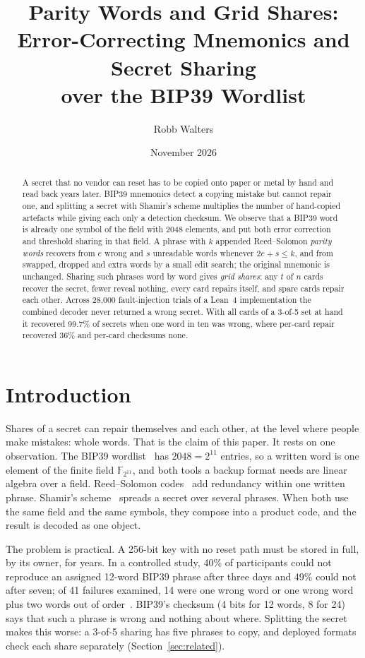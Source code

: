 \documentclass[numeric]{anvil-paper}
\title{Parity Words and Grid Shares:\\ Error-Correcting Mnemonics and Secret Sharing\\ over the BIP39 Wordlist}
\author{Robb Walters}
\date{November 2026}
\newcommand{\F}{\mathbb{F}}
\begin{document}
\maketitle

\begin{abstract}
A secret that no vendor can reset has to be copied onto paper or metal by hand
and read back years later. BIP39 mnemonics detect a copying mistake but cannot
repair one, and splitting a secret with Shamir's scheme multiplies the number of
hand-copied artefacts while giving each only a detection checksum. We observe
that a BIP39 word is already one symbol of the field with 2048 elements, and put
both error correction and threshold sharing in that field. A phrase with $k$
appended Reed--Solomon \emph{parity words} recovers from $e$ wrong and $s$
unreadable words whenever $2e+s\le k$, and from swapped, dropped and extra words
by a small edit search; the original mnemonic is unchanged. Sharing such phrases
word by word gives \emph{grid shares}: any $t$ of $n$ cards recover the secret,
fewer reveal nothing, every card repairs itself, and spare cards repair each
other. Across 28{,}000 fault-injection trials of a Lean~4 implementation the
combined decoder never returned a wrong secret. With all cards of a 3-of-5 set
at hand it recovered 99.7\% of secrets when one word in ten was wrong, where
per-card repair recovered 36\% and per-card checksums none.
\end{abstract}

\section{Introduction}
\label{sec:intro}

Shares of a secret can repair themselves and each other, at the level where
people make mistakes: whole words. That is the claim of this paper. It rests on
one observation. The BIP39 wordlist~\citep{bip39} has $2048 = 2^{11}$ entries,
so a written word is one element of the finite field $\F_{2^{11}}$, and both
tools a backup format needs are linear algebra over a field. Reed--Solomon
codes~\citep{reed1960polynomial} add redundancy within one written phrase.
Shamir's scheme~\citep{shamir1979how} spreads a secret over several phrases.
When both use the same field and the same symbols, they compose into a product
code, and the result is decoded as one object.

The problem is practical. A 256-bit key with no reset path must be stored in
full, by its owner, for years. In a controlled study, 40\% of participants could
not reproduce an assigned 12-word BIP39 phrase after three days and 49\% could
not after seven; of 41 failures examined, 14 were one wrong word or one wrong
word plus two words out of order~\citep{ambati2026notall}. BIP39's checksum
(4 bits for 12 words, 8 for 24) says that such a phrase is wrong and nothing
about where. Splitting the secret makes this worse: a 3-of-5 sharing has five
phrases to copy, and deployed formats check each share separately
(Section~\ref{sec:related}).
\end{document}
